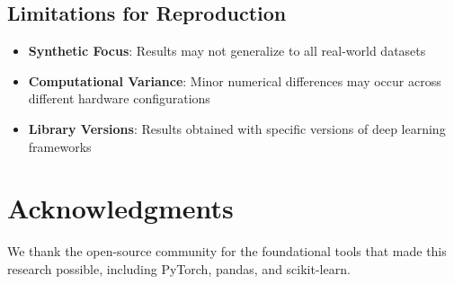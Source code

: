 \documentclass[11pt]{article}
\begin{document}
\subsection*{Limitations for Reproduction}

\begin{itemize}
\item \textbf{Synthetic Focus}: Results may not generalize to all real-world datasets
\item \textbf{Computational Variance}: Minor numerical differences may occur across different hardware configurations
\item \textbf{Library Versions}: Results obtained with specific versions of deep learning frameworks
\end{itemize}

\section*{Acknowledgments}

We thank the open-source community for the foundational tools that made this research possible, including PyTorch, pandas, and scikit-learn.
\end{document}
